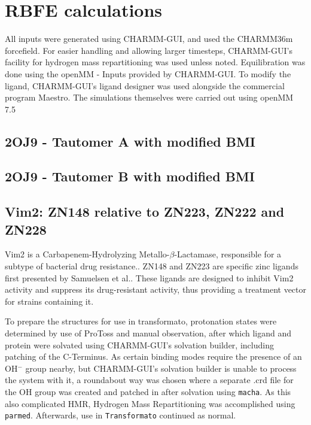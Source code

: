 \documentclass[oneside]{scrreprt}
\begin{document}
\section{RBFE calculations}
All inputs were generated using CHARMM-GUI\cite{Jo2008Aug}, and used the CHARMM36m forcefield\cite{Huang2017Jan}. For easier handling and allowing larger timesteps, CHARMM-GUI's facility for hydrogen mass repartitioning\cite{Gao2021Feb} was used unless noted. Equilibration was done using the openMM - Inputs provided by CHARMM-GUI\cite{Brooks2009Jul,Lee2016Jan}. To modify the ligand, CHARMM-GUI's ligand designer\cite{Guterres2021Nov} was used alongside the commercial program Maestro\cite{maestro}. The simulations themselves were carried out using openMM 7.5\cite{Eastman2017Jul}


\subsection{2OJ9 - Tautomer A with modified BMI}
\subsection{2OJ9 - Tautomer B with modified BMI}
\subsection{Vim2: ZN148 relative to ZN223, ZN222 and ZN228}
Vim2 is a Carbapenem-Hydrolyzing Metallo-$\beta$-Lactamase, responsible for a subtype of bacterial drug resistance.\cite{Poirel2000Apr}. ZN148 and ZN223 are specific zinc ligands first presented by Samuelsen et al.\cite{Samuelsen2020Jun}. These ligands are designed to inhibit Vim2 activity and suppress its drug-resistant activity, thus providing a treatment vector for strains containing it. 

To prepare the structures for use in transformato, protonation states were determined by use of ProToss\cite{Lippert2009Dec,Bietz2014Dec} and manual observation, after which ligand and protein were solvated using CHARMM-GUI's solvation builder, including patching of the C-Terminus. As certain binding modes require the presence of an OH$^-$ group nearby, but CHARMM-GUI's solvation builder is unable to process the system with it, a roundabout way was chosen where a separate .crd file for the OH group was created and patched in after solvation using \texttt{macha}\cite{twotoneblue2022May}. As this also complicated HMR, Hydrogen Mass Repartitioning was accomplished using \texttt{parmed}\cite{Shirts2016Sep}. Afterwards, use in \texttt{Transformato} continued as normal.
\end{document}

